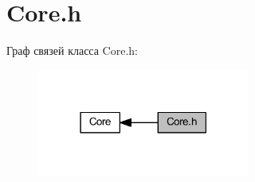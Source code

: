 \hypertarget{group__coreh}{}\section{Core.\+h}
\label{group__coreh}
Граф связей класса Core.\+h\+:
\nopagebreak
\begin{figure}[H]
\begin{center}
\leavevmode
\includegraphics[width=198pt]{group__coreh}
\end{center}
\end{figure}
